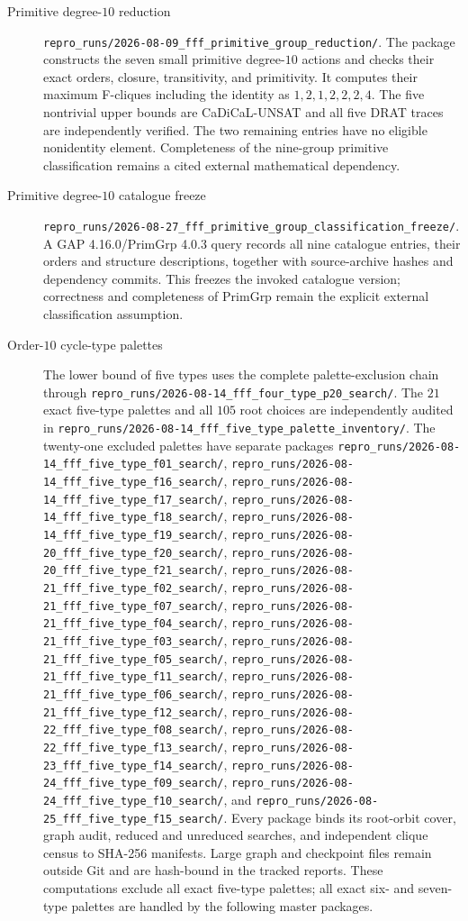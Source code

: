 \begin{description}
\item[Primitive degree-$10$ reduction]
\nolinkurl{repro_runs/2026-08-09_fff_primitive_group_reduction/}.
The package constructs the seven small primitive degree-$10$ actions and
checks their exact orders, closure, transitivity, and primitivity.  It
computes their maximum F-cliques including the identity as
$1,2,1,2,2,2,4$.  The five nontrivial upper bounds are CaDiCaL-UNSAT and all
five DRAT traces are independently verified.  The two remaining entries have
no eligible nonidentity element.  Completeness of the nine-group primitive
classification remains a cited external mathematical dependency.

\item[Primitive degree-$10$ catalogue freeze]
\nolinkurl{repro_runs/2026-08-27_fff_primitive_group_classification_freeze/}.
A GAP 4.16.0/PrimGrp 4.0.3 query records all nine catalogue entries, their
orders and structure descriptions, together with source-archive hashes and
dependency commits.  This freezes the invoked catalogue version; correctness
and completeness of PrimGrp remain the explicit external classification
assumption.

\item[Order-$10$ cycle-type palettes]
The lower bound of five types uses the complete palette-exclusion chain
through
\nolinkurl{repro_runs/2026-08-14_fff_four_type_p20_search/}.
The $21$ exact five-type palettes and all $105$ root choices are independently
audited in
\nolinkurl{repro_runs/2026-08-14_fff_five_type_palette_inventory/}.
The twenty-one excluded palettes have separate packages
\nolinkurl{repro_runs/2026-08-14_fff_five_type_f01_search/},
\nolinkurl{repro_runs/2026-08-14_fff_five_type_f16_search/},
\nolinkurl{repro_runs/2026-08-14_fff_five_type_f17_search/},
\nolinkurl{repro_runs/2026-08-14_fff_five_type_f18_search/},
\nolinkurl{repro_runs/2026-08-14_fff_five_type_f19_search/},
\nolinkurl{repro_runs/2026-08-20_fff_five_type_f20_search/},
\nolinkurl{repro_runs/2026-08-20_fff_five_type_f21_search/},
\nolinkurl{repro_runs/2026-08-21_fff_five_type_f02_search/},
\nolinkurl{repro_runs/2026-08-21_fff_five_type_f07_search/},
\nolinkurl{repro_runs/2026-08-21_fff_five_type_f04_search/},
\nolinkurl{repro_runs/2026-08-21_fff_five_type_f03_search/},
\nolinkurl{repro_runs/2026-08-21_fff_five_type_f05_search/},
\nolinkurl{repro_runs/2026-08-21_fff_five_type_f11_search/},
\nolinkurl{repro_runs/2026-08-21_fff_five_type_f06_search/},
\nolinkurl{repro_runs/2026-08-21_fff_five_type_f12_search/},
\nolinkurl{repro_runs/2026-08-22_fff_five_type_f08_search/},
\nolinkurl{repro_runs/2026-08-22_fff_five_type_f13_search/},
\nolinkurl{repro_runs/2026-08-23_fff_five_type_f14_search/},
\nolinkurl{repro_runs/2026-08-24_fff_five_type_f09_search/},
\nolinkurl{repro_runs/2026-08-24_fff_five_type_f10_search/}, and
\nolinkurl{repro_runs/2026-08-25_fff_five_type_f15_search/}.
Every package binds its root-orbit cover, graph audit, reduced and unreduced
searches, and independent clique census to SHA-256 manifests.  Large graph
and checkpoint files remain outside Git and are hash-bound in the tracked
reports. These computations exclude all exact five-type palettes; all exact
six- and seven-type palettes are handled by the following master packages.


\end{description}
